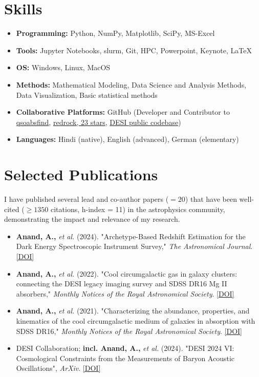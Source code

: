 \documentclass[a4paper,11pt]{article}
\begin{document}
\section*{Skills}
\begin{itemize}[noitemsep, topsep=0pt]
    \item \textbf{Programming:} Python, NumPy, Matplotlib, SciPy, MS-Excel
    \item \textbf{Tools:} Jupyter Notebooks, slurm, Git, HPC, Powerpoint, Keynote, LaTeX
    \item \textbf{OS:} Windows, Linux, MacOS
    \item \textbf{Methods:} Mathematical Modeling, Data Science and Analysis Methods, Data Visualization, Basic statistical methods
    \item \textbf{Collaborative Platforms:} GitHub (Developer and Contributor to \href{https://github.com/abhi0395/qsoabsfind}{qsoabsfind}, \href{https://github.com/desihub/redrock}{redrock, 23 stars}, \href{https://github.com/desihub}{DESI public codebase})
     \item \textbf{Languages:} Hindi (native), English (advanced), German (elementary)
\end{itemize}

\section*{Selected Publications}
I have published several lead and co-author papers ($= 20$) that have been well-cited ($\geq 1350$ citations, h-index = 11) in the astrophysics community, demonstrating the impact and relevance of my research.
\begin{itemize}[noitemsep, topsep=0pt]
    \item \textbf{Anand, A.,} \textit{et al.} (2024). "Archetype-Based Redshift Estimation for the Dark Energy Spectroscopic Instrument Survey," \textit{The Astronomical Journal}. \href{https://iopscience.iop.org/article/10.3847/1538-3881/ad60c2}{[DOI]}
    \item \textbf{Anand, A.,} \textit{et al.} (2022). "Cool circumgalactic gas in galaxy clusters: connecting the DESI legacy imaging survey and SDSS DR16 Mg II absorbers," \textit{Monthly Notices of the Royal Astronomical Society}. \href{https://doi.org/10.1093/mnras/stab871}{[DOI]}
    \item \textbf{Anand, A.,} \textit{et al.} (2021). "Characterizing the abundance, properties, and kinematics of the cool circumgalactic medium of galaxies in absorption with SDSS DR16," \textit{Monthly Notices of the Royal Astronomical Society}. \href{https://doi.org/10.1093/mnras/stac928}{[DOI]}
    \item DESI Collaboration; \textbf{incl. Anand, A.,} \textit{et al.} (2024). "DESI 2024 VI: Cosmological Constraints from the Measurements of Baryon Acoustic Oscillations", \textit{ArXiv}. \href{10.48550/arXiv.2404.03002}{[DOI]}
\end{itemize}
\end{document}
